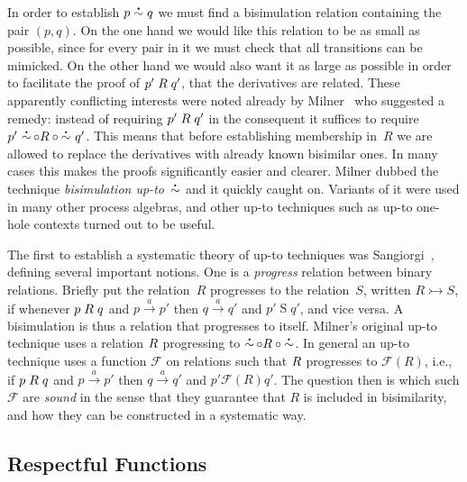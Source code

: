 \documentclass{CSML}
\theoremstyle{definition}
\newcommand{\act}{a}
\newcommand{\trans}[2]{{#1} \stackrel{\act}{\longrightarrow} {#2}}
\newcommand{\bisim}{\stackrel{\mbox{\bf .}}{\sim}}
\newcommand{\progress}{\rightarrowtail}
\newcommand{\F}{\mathcal{F}}
\renewcommand{\S}{\mathrel{S}}
\begin{document}
In order to establish $p \bisim q$ we must find a bisimulation
relation containing the pair $(p,q)$. On the one hand we would like
this relation to be as small as possible, since for every pair in it
we must check that all transitions can be mimicked. On the other hand
we would also want it as large as possible in order to facilitate the
proof of $p'\mathrel{R} q'$, that the derivatives are related. These apparently
conflicting interests were noted already by Milner~\cite{Milner1989}
who suggested a remedy: instead of requiring $p'\mathrel{R} q'$ in the
consequent it suffices to require $p' \,\mathop{\bisim} \circ R \circ
\mathop{\bisim}\, q'$. This means that before establishing membership
in~$R$ we are allowed to replace the derivatives with already known
bisimilar ones. In many cases this makes the proofs significantly
easier and clearer. Milner dubbed the technique {\em bisimulation
  up-to~$\bisim$} and it quickly caught on. Variants of it were used
in many other process algebras, and other up-to techniques such as
up-to one-hole contexts
turned out to be useful.

The first to establish a systematic theory of up-to techniques was
Sangiorgi~\cite{Sangiorgi1994,Sangiorgi1998}, defining several
important notions. One is a {\em progress} relation between binary
relations. Briefly put the relation~$R$ progresses to the
relation~$S$, written $R \progress S$, if whenever $p \mathrel{R} q$ and
$\trans{p}{p'}$ then $\trans{q}{q'}$ and $p'\S q'$, and vice versa. A bisimulation is
thus a relation that progresses to itself. Milner's original up-to
technique uses a relation $\mathrel{R}$ progressing to $\mathop{\bisim} \circ R
\circ \mathop{\bisim}$. In general an up-to technique uses a function
$\F$ on relations such that $\mathrel{R}$ progresses to $\F(R)$, i.e., if $p \mathrel{R}
q$ and $\trans{p}{p'}$ then $\trans{q}{q'}$ and $p' \mathrel{\F(R)}
q'$. The question then is which such $\F$ are {\em sound} in the sense
that they guarantee that $R$ is included in bisimilarity, and how they
can be constructed in a systematic way.

\subsection{Respectful Functions}
\end{document}
